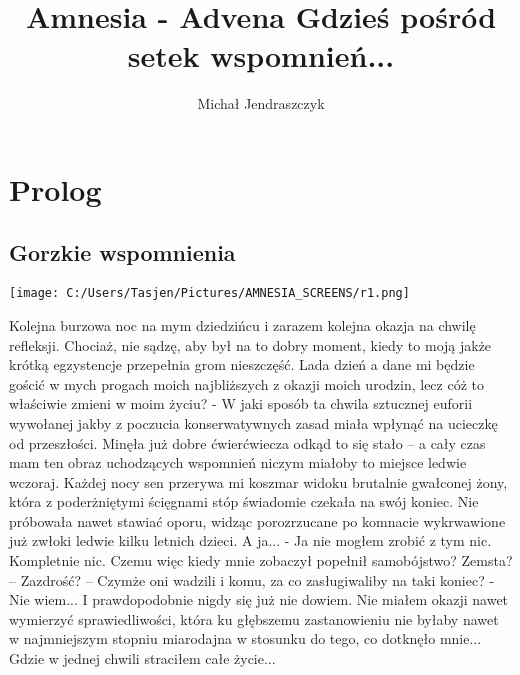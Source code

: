 \documentclass[12pt,a4paper]{report}
\author{Michał Jendraszczyk}
\begin{document}
\rhead{}
\linespread{1.3}
\title{\textbf{\huge{Amnesia - Advena}} \linebreak \large{Gdzieś pośród setek wspomnień...}}

\begin{titlepage}
  \thispagestyle{plain}
 \thispagestyle{empty}
  \maketitle 
\end{titlepage}

\pagebreak  
\tableofcontents
\pagebreak 
\section{\textbf{Prolog}}
\subsection{Gorzkie wspomnienia}
\begin{center}
\texttt{[image: C:/Users/Tasjen/Pictures/AMNESIA\_SCREENS/r1.png]} \\
\end{center} 

Kolejna burzowa noc na mym dziedzińcu i zarazem kolejna okazja na chwilę refleksji. Chociaż, nie sądzę, aby był na to dobry moment, kiedy to moją jakże krótką egzystencje przepełnia grom nieszczęść. Lada dzień a dane mi będzie gościć w mych progach moich najbliższych z okazji moich urodzin, lecz cóż to właściwie zmieni w moim życiu? - W jaki sposób ta chwila sztucznej euforii wywołanej jakby z poczucia konserwatywnych zasad miała wpłynąć na ucieczkę od przeszłości. Minęła już dobre ćwierćwiecza odkąd to się stało – a cały czas mam ten obraz uchodzących wspomnień niczym miałoby to miejsce ledwie wczoraj. Każdej nocy sen przerywa mi koszmar widoku brutalnie gwałconej żony, która z poderżniętymi ścięgnami stóp świadomie czekała na swój koniec. Nie próbowała nawet stawiać oporu, widząc porozrzucane po komnacie wykrwawione już zwłoki ledwie kilku letnich dzieci. A ja... - Ja nie mogłem zrobić z tym nic. Kompletnie nic. Czemu więc kiedy mnie zobaczył popełnił samobójstwo? Zemsta? – Zazdrość? – Czymże oni wadzili i komu, za co zasługiwaliby na taki koniec? - Nie wiem...   I prawdopodobnie nigdy się już nie dowiem. Nie miałem okazji nawet wymierzyć sprawiedliwości, która ku głębszemu zastanowieniu nie byłaby nawet w najmniejszym stopniu miarodajna w stosunku do tego, co dotknęło mnie... Gdzie w jednej chwili straciłem całe życie...
 
\end{document}
